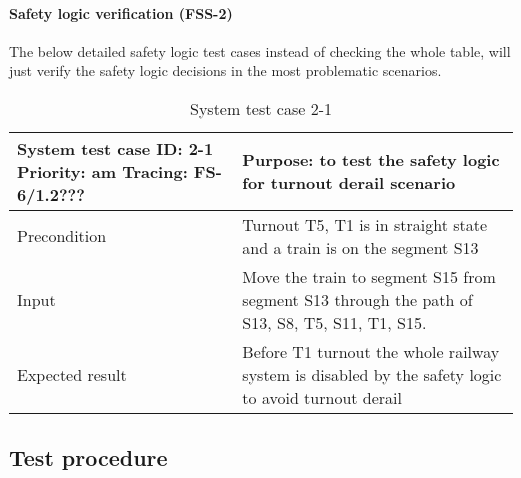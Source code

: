 \paragraph{Safety logic verification (FSS-2)} The below detailed safety logic test cases instead of checking the whole table, will just verify the safety logic decisions in the most problematic scenarios. 
\begin{table}[H]
	\caption{System test case 2-1}
	\label{table:TCase-FSS2-01}
	\begin{center}
		\renewcommand{\arraystretch}{1.8}
		\begin{tabu} 
			to 0.9 \textwidth
			{  X[0.4, c] X[c] }
			\toprule
			System test case ID: 2-1 \newline Priority: am \newline Tracing: FS-6/1.2??? & Purpose: to test the safety logic for turnout derail scenario                                      \\ \midrule
			Precondition                                                                 & Turnout T5, T1 is in straight state and a train is on the segment S13                              \\
			Input                                                                        & Move the train to segment S15 from segment S13 through the path of S13, S8, T5, S11, T1, S15.      \\
			Expected result                                                              & Before T1 turnout the whole railway system is disabled by the safety logic to avoid turnout derail \\ \bottomrule
		\end{tabu}
	\end{center}
\end{table}

\subsection{Test procedure} 
